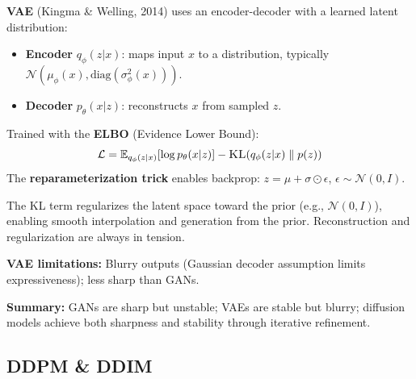 \begin{paperbox}[title={VAE: Latent Variable Model}]
\textbf{VAE} (Kingma \& Welling, 2014) uses an encoder-decoder with a learned latent distribution:
\begin{itemize}
  \item \textbf{Encoder} $q_\phi(z|x)$: maps input $x$ to a distribution, typically $\mathcal{N}(\mu_\phi(x), \text{diag}(\sigma_\phi^2(x)))$.
  \item \textbf{Decoder} $p_\theta(x|z)$: reconstructs $x$ from sampled $z$.
\end{itemize}
Trained with the \textbf{ELBO} (Evidence Lower Bound):
\[
\mathcal{L} = \mathbb{E}_{q_\phi(z|x)}[\log p_\theta(x|z)] - \textsc{KL}(q_\phi(z|x) \parallel p(z))
\]
The \textbf{reparameterization trick} enables backprop: $z = \mu + \sigma \odot \epsilon$, $\epsilon \sim \mathcal{N}(0,I)$.

\begin{intuitionbox}
The KL term regularizes the latent space toward the prior (e.g., $\mathcal{N}(0,I)$), enabling smooth interpolation and generation from the prior. Reconstruction and regularization are always in tension.
\end{intuitionbox}

\textbf{VAE limitations:} Blurry outputs (Gaussian decoder assumption limits expressiveness); less sharp than GANs.
\end{paperbox}

\begin{notebox}
\textbf{Summary:} GANs are sharp but unstable; VAEs are stable but blurry; diffusion models achieve both sharpness and stability through iterative refinement.
\end{notebox}


\subsection{DDPM \& DDIM}

